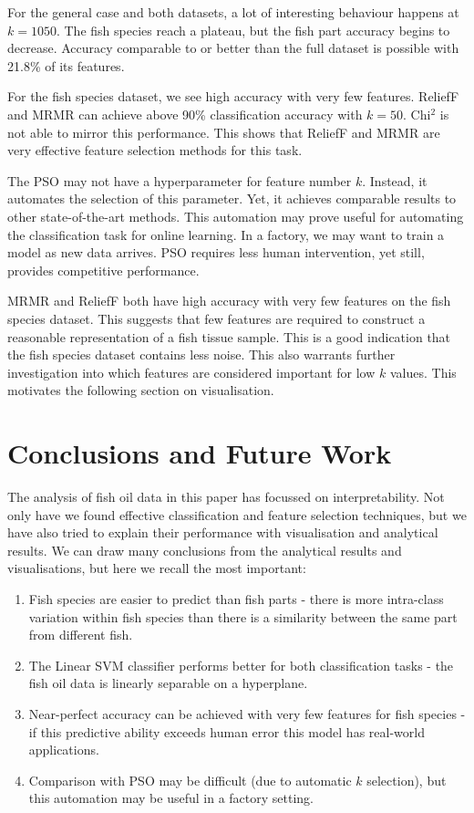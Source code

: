 \documentclass[runningheads]{llncs}
\begin{document}
For the general case and both datasets, a lot of interesting behaviour happens at $k=1050$.
The fish species reach a plateau, but the fish part accuracy begins to decrease.
Accuracy comparable to or better than the full dataset is possible with 21.8\% of its features.

For the fish species dataset, we see high accuracy with very few features.
ReliefF and MRMR can achieve above 90\% classification accuracy with $k = 50$.
Chi$^2$ is not able to mirror this performance.
This shows that ReliefF and MRMR are very effective feature selection methods for this task.

The PSO may not have a hyperparameter for feature number $k$.
Instead, it automates the selection of this parameter.
Yet, it achieves comparable results to other state-of-the-art methods.
This automation may prove useful for automating the classification task for online learning.
In a factory, we may want to train a model as new data arrives.
PSO requires less human intervention, yet still, provides competitive performance.

MRMR and ReliefF both have high accuracy with very few features on the fish species dataset.
This suggests that few features are required to construct a reasonable representation of a fish tissue sample.
This is a good indication that the fish species dataset contains less noise.
This also warrants further investigation into which features are considered important for low $k$ values.
This motivates the following section on visualisation.

\section{Conclusions and Future Work}


The analysis of fish oil data in this paper has focussed on interpretability. 
Not only have we found effective classification and feature selection techniques, but we have also tried to explain their performance with visualisation and analytical results. 
We can draw many conclusions from the analytical results and visualisations, but here we recall the most important:

\begin{enumerate}
  \item Fish species are easier to predict than fish parts - there is more intra-class variation within fish species than there is a similarity between the same part from different fish.
  \item The Linear SVM classifier performs better for both classification tasks - the fish oil data is linearly separable on a hyperplane.
  \item Near-perfect accuracy can be achieved with very few features for fish species - if this predictive ability exceeds human error this model has real-world applications.
  \item Comparison with PSO may be difficult (due to automatic $k$ selection), but this automation may be useful in a factory setting.
\end{enumerate}
\end{document}
